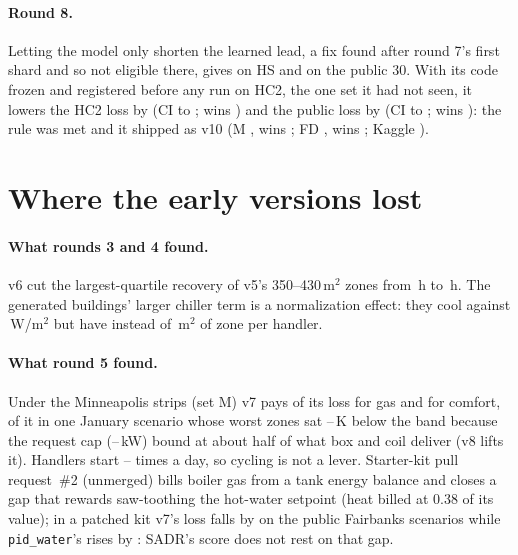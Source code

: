 \documentclass{article}
\begin{document}
\paragraph{Round 8.}
Letting the model only shorten the learned lead, a fix found after round 7's first shard and so not eligible there,
gives \RSevLedgerHsRel{} on HS and \RSevLedgerPubRel{} on the public 30. With its code frozen and registered before any
run on HC2, the one set it had not seen, it lowers the HC2 loss by \REigConfHarshCTwoRelAbs{} (CI
\REigConfHarshCTwoRelHiAbs{} to \REigConfHarshCTwoRelLoAbs; wins \REigConfHarshCTwoWins) and the public loss by
\REigConfPubRelAbs{} (CI \REigConfPubRelHiAbs{} to \REigConfPubRelLoAbs; wins \REigConfPubWins): the rule was met
and it shipped as v10 (M \REigConfMinnRel, wins \REigConfMinnWins; FD \REigConfFreshDefRel, wins
\REigConfFreshDefWins; Kaggle \REigKagVTen).

\section{Where the early versions lost}
\label{app:diag}
\paragraph{What rounds 3 and 4 found.}
v6 cut the largest-quartile recovery of v5's 350--430\,m$^2$ zones from \DecHeldRVFiveRecoveryBig\,h to
\DecHeldROursRecoveryBig\,h. The generated buildings' larger chiller term is a normalization effect: they cool
\RFCoolWmRThree{} against \RFCoolWmPub\,W/m$^2$ but have \RFAreaPerAhuRThree{} instead of \RFAreaPerAhuPub\,m$^2$ of zone per handler.

\paragraph{What round 5 found.}
Under the Minneapolis strips (set M) v7 pays \RFiveDecMinnGasShare{} of its loss for gas and
\RFiveDecMinnComfortShare{} for comfort, \RFiveCapComfortShareOfMinn{} of it in one January scenario whose
\RFiveCapNZones{} worst zones sat \RFiveCapDefMin--\RFiveCapDefMax\,K below the band because the request cap
(\RFiveCapReqKwMin--\RFiveCapReqKwMax\,kW) bound at about half of what box and coil deliver (v8 lifts it). Handlers
start \RFiveAhuStartsMin--\RFiveAhuStartsMax{} times a day, so cycling is not a lever. Starter-kit pull request~\#2
(unmerged) bills boiler gas from a tank energy balance and closes a gap that rewards saw-toothing the hot-water
setpoint (heat billed at 0.38 of its value); in a patched kit v7's loss falls by \RFivePrTwoVSevenRelAbs{} on the
\RFivePrTwoVSevenN{} public Fairbanks scenarios while \texttt{pid\_water}'s rises by \RFivePrTwoPidRelAbs: SADR's score
does not rest on that gap.
\end{document}
